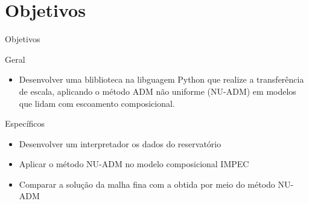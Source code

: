 \documentclass[professionalfont]{beamer}
\begin{document}
\section{Objetivos}

\begin{frame}{Objetivos}

    \begin{block}{Geral}
        \begin{itemize}
            \item Desenvolver uma bliblioteca na libguagem Python que realize a transferência de escala, aplicando o método ADM não uniforme (NU-ADM) em modelos que lidam com escoamento composicional.
        \end{itemize}
    \end{block}

    \begin{block}{Específicos}
        \begin{itemize}
            \item Desenvolver um interpretador os dados do reservatório
            \item Aplicar o método NU-ADM no modelo composicional IMPEC
            \item Comparar a solução da malha fina com a obtida por meio do método NU-ADM
        \end{itemize}
    \end{block}
    
\end{frame}

    
    
\end{document}
